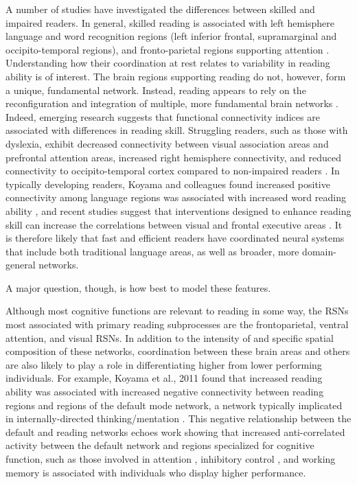 A number of studies have investigated the differences between skilled and impaired readers. In general, skilled reading is associated with left hemisphere language and word recognition regions (left inferior frontal, supramarginal and occipito-temporal regions), and fronto-parietal regions supporting attention \citep{Paulesu2014}. Understanding how their coordination at rest relates to variability in reading ability is of interest. The brain regions supporting reading do not, however, form a unique, fundamental network. Instead, reading appears to rely on the reconfiguration and integration of multiple, more fundamental brain networks \citep{Koyama2010, Vogel2013}. Indeed, emerging research suggests that functional connectivity indices are associated with differences in reading skill. Struggling readers, such as those with dyslexia, exhibit decreased connectivity between visual association areas and prefrontal attention areas, increased right hemisphere connectivity, and reduced connectivity to occipito-temporal cortex compared to non-impaired readers \citep{Finn2014}.  In typically developing readers, Koyama and colleagues found increased positive connectivity among language regions was associated with increased word reading ability \citep{Koyama2011}, and recent studies suggest that interventions designed to enhance reading skill can increase the correlations between visual and frontal executive areas \citep{Horowitz-Kraus2015}. It is therefore likely that fast and efficient readers have coordinated neural systems that include both traditional language areas, as well as broader, more domain-general networks.  

A major question, though, is how best to model these features. 


Although most cognitive functions are relevant to reading in some way, the RSNs most associated with primary reading subprocesses are the frontoparietal, ventral attention, and visual RSNs.  In addition to the intensity of and specific spatial composition of these networks, coordination between these brain areas and others are also likely to play a role in differentiating higher from lower performing individuals. For example, Koyama et al., 2011 found that increased reading ability was associated with increased negative connectivity between reading regions and regions of the default mode network, a network typically implicated in internally-directed thinking/mentation \citep{Andrews-Hanna2011}. This negative relationship between the default and reading networks echoes work showing that increased anti-correlated activity between the default network and regions specialized for cognitive function, such as those involved in attention \citep{Kelly2008, Mennes2010, Seeley2007}, inhibitory control \citep{Tian2013}, and working memory \citep{Keller2015, Sala-Llonch2011} is associated with individuals who display higher performance.

